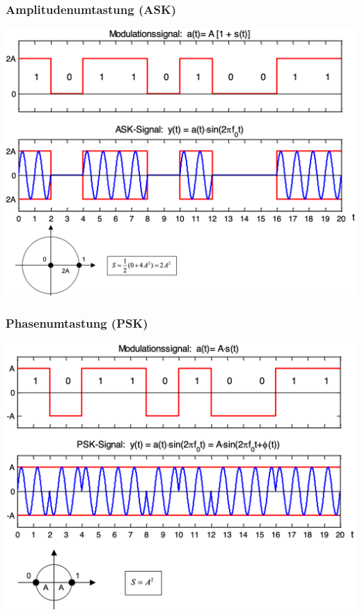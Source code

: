 \subsubsection{Amplitudenumtastung (ASK)}
\begin{center}
    \includegraphics[width=\linewidth]{graphic/fourier/Amplitudenumtastung.png}
\end{center}
\vspace{-8pt}

\subsubsection{Phasenumtastung (PSK)}
\begin{center}
    \includegraphics[width=\linewidth]{graphic/fourier/Phasenumtastung.png}
\end{center}
\vspace{-8pt}

